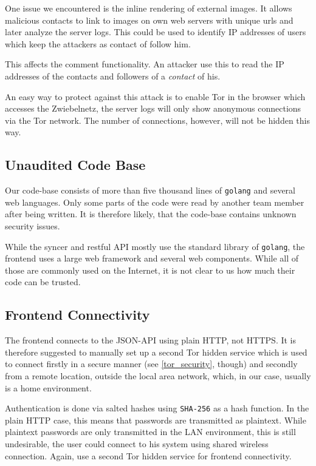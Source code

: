 \documentclass[12pt]{article}
\begin{document}
One issue we encountered is the inline rendering of external images. It allows malicious contacts to link to images on own web servers with unique urls and later analyze the server logs. This could be used to identify IP addresses of users which keep the attackers as contact of follow him.

This affects the comment functionality. An attacker use this to read the IP addresses of the contacts and followers of a \textit{contact} of his.

An easy way to protect against this attack is to enable Tor in the browser which accesses the Zwiebelnetz, the server logs will only show anonymous connections via the Tor network. The number of connections, however, will not be hidden this way.

\subsection{Unaudited Code Base}

Our code-base consists of more than five thousand lines of \texttt{golang} and several web languages. Only some parts of the code were read by another team member after being written. It is therefore likely, that the code-base contains unknown security issues.

While the syncer and restful API mostly use the standard library of \texttt{golang}, the frontend uses a large web framework and several web components. While all of those are commonly used on the Internet, it is not clear to us how much their code can be trusted.

\subsection{Frontend Connectivity}

The frontend connects to the JSON-API using plain HTTP, not HTTPS. It is therefore suggested to manually set up a second Tor hidden service which is used to connect firstly in a secure manner (see \autoref{tor_security}, though) and secondly from a remote location, outside the local area network, which, in our case, usually is a home environment.

Authentication is done via salted hashes using \texttt{SHA-256} as a hash function. In the plain HTTP case, this means that passwords are transmitted as plaintext. While plaintext passwords are only transmitted in the LAN environment, this is still undesirable, the user could connect to his system using shared wireless connection. Again, use a second Tor hidden service for frontend connectivity.
\end{document}
